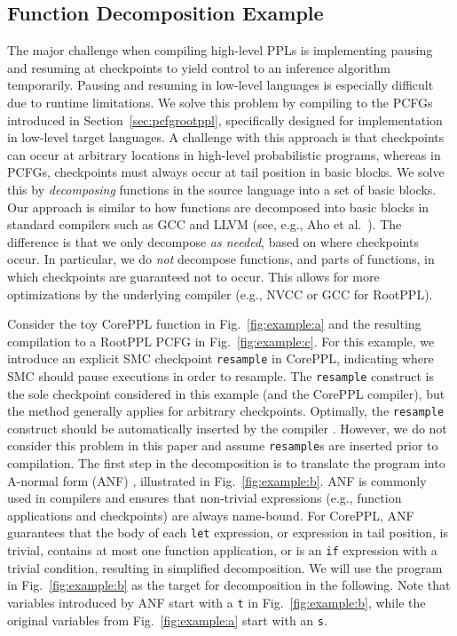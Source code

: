 \documentclass[runningheads]{llncs}
\newcommand{\clstinline}{\lstinline[language=CorePPL]}
\begin{document}
\subsection{Function Decomposition Example}\label{sec:decex}
The major challenge when compiling high-level PPLs is implementing pausing and resuming at checkpoints to yield control to an inference algorithm temporarily.
Pausing and resuming in low-level languages is especially difficult due to runtime limitations.
We solve this problem by compiling to the PCFGs introduced in Section~\ref{sec:pcfgrootppl}, specifically designed for implementation in low-level target languages.
A challenge with this approach is that checkpoints can occur at arbitrary locations in high-level probabilistic programs, whereas in PCFGs, checkpoints must always occur at tail position in basic blocks.
We solve this by \emph{decomposing} functions in the source language into a set of basic blocks.
Our approach is similar to how functions are decomposed into basic blocks in standard compilers such as GCC \cite{gcc2021} and LLVM \cite{llvm2021} (see, e.g., Aho et al.~\cite{aho2006compilers}).
The difference is that we only decompose \emph{as needed}, based on where checkpoints occur.
In particular, we do \emph{not} decompose functions, and parts of functions, in which checkpoints are guaranteed not to occur.
This allows for more optimizations by the underlying compiler (e.g., NVCC or GCC for RootPPL).

Consider the toy CorePPL function in Fig.~\ref{fig:example:a} and the resulting compilation to a RootPPL PCFG in Fig.~\ref{fig:example:c}.
For this example, we introduce an explicit SMC checkpoint \clstinline!resample! in CorePPL, indicating where SMC should pause executions in order to resample.
The \clstinline!resample! construct is the sole checkpoint considered in this example (and the CorePPL compiler), but the method generally applies for arbitrary checkpoints.
Optimally, the \clstinline!resample! construct should be automatically inserted by the compiler \cite{lunden2018automatic}.
However, we do not consider this problem in this paper and assume \clstinline!resample!s are inserted prior to compilation.
The first step in the decomposition is to translate the program into A-normal form (ANF) \cite{flanagan1993essence}, illustrated in Fig.~\ref{fig:example:b}.
ANF is commonly used in compilers and ensures that non-trivial expressions (e.g., function applications and checkpoints) are always name-bound.
For CorePPL, ANF guarantees that the body of each \clstinline!let! expression, or expression in tail position, is trivial, contains at most one function application, or is an \clstinline!if! expression with a trivial condition, resulting in simplified decomposition. We will use the program in Fig.~\ref{fig:example:b} as the target for decomposition in the following.
Note that variables introduced by ANF start with a \lstinline!t! in Fig.~\ref{fig:example:b}, while the original variables from Fig.~\ref{fig:example:a} start with an \lstinline!s!.
\end{document}
